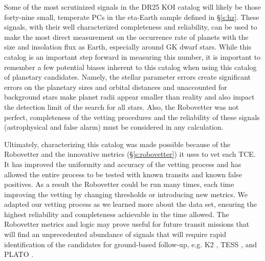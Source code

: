 {\color{blue}
Some of the most scrutinized signals in the DR25 KOI catalog will likely be those forty-nine small, temperate PCs in the eta-Earth sample defined in \S\ref{s:hz}.  These signals, with their well characterized completeness and reliability, can be used to make the most direct measurement on the occurrence rate of planets with the size and insolation flux as Earth, especially around GK dwarf stars.  While this catalog is an important step forward in measuring this number, it is important to remember a few potential biases inherent to this catalog when using this catalog of planetary candidates. Namely, the stellar parameter errors create significant errors on the planetary sizes and orbital distances and unaccounted for background stars make planet radii appear smaller than reality and also impact the detection limit of the search for all stars.  Also, the Robovetter was not perfect, completeness of the vetting procedures and the reliability of these signals (astrophysical and false alarm) must be considered in any calculation.
}

Ultimately, characterizing this catalog was made possible because of the Robovetter and the innovative metrics (\S\ref{s:robovetter}) it uses to vet each TCE. It has improved the uniformity and accuracy of the vetting process and has allowed the entire process to be tested with known transits and known false positives. As a result the Robovetter could be run many times, each time improving the vetting by changing thresholds or introducing new metrics. We adapted our vetting process as we learned more about the data set, ensuring the highest reliability and completeness achievable in the time allowed.  The Robovetter metrics and logic may prove useful for future transit missions that will find an unprecedented abundance of signals that will require rapid identification of the candidates for ground-based follow-up, e.g. K2 \citep{Howell2014}, TESS \citep{Ricker2015}, and PLATO \citep{Rauer2016}. 



